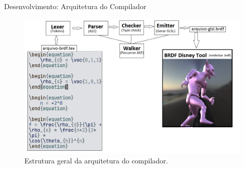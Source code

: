 \begin{frame}{Desenvolvimento: Arquitetura do Compilador}
    \begin{figure}
        \centering
        \includegraphics[scale=0.35]{./Imagens/new-arch-compiler.png}
        \caption{\small Estrutura geral da arquitetura do compilador.}
    \end{figure}
\end{frame}


